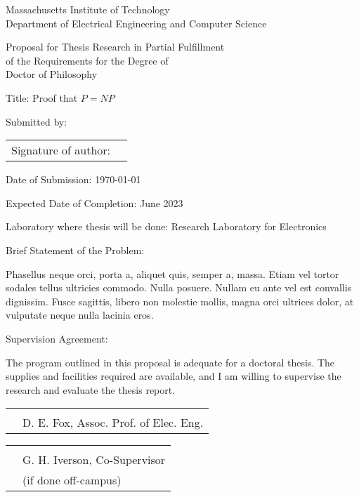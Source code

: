 \documentclass[12pt]{article}
\begin{document}
\begin{center}
  Massachusetts Institute of Technology \\
  Department of Electrical Engineering and Computer Science 

  Proposal for Thesis Research in Partial Fulfillment\\
  of the Requirements for the Degree of\\
  Doctor of Philosophy
\end{center}

Title: Proof that $P=NP$

Submitted by: 

\vspace{2em}
\begin{tabular}{@{}p{1.5in}p{4.5in}@{}}
Signature of author: & \hrulefill \\
\end{tabular}

Date of Submission: \today

Expected Date of Completion: June 2023

Laboratory where thesis will be done: Research Laboratory for Electronics

Brief Statement of the Problem:

Phasellus neque orci, porta a, aliquet quis, semper a, massa. Etiam vel tortor sodales tellus ultricies commodo. Nulla posuere. Nullam eu ante vel est convallis dignissim. Fusce sagittis, libero non molestie mollis, magna orci ultrices dolor, at vulputate neque nulla lacinia eros.   

Supervision Agreement:

The program outlined in this proposal is adequate for a doctoral thesis. The
supplies and facilities required are available, and I am willing to supervise
the research and evaluate the thesis report.

\vspace{2em}
\begin{tabular}{@{}p{1.5in}p{4.5in}@{}}
   & \hrulefill \\
   & D. E. Fox, Assoc. Prof. of Elec. Eng.
\end{tabular}

\vspace{2em}
\begin{tabular}{@{}p{1.5in}p{4.5in}@{}}
  & \hrulefill \\
  & G. H. Iverson, Co-Supervisor \\
  & (if done off-campus) \\
\end{tabular}
\pagebreak
\end{document}
